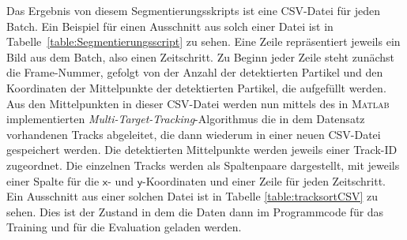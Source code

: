 Das Ergebnis von diesem Segmentierungsskripts ist eine CSV-Datei für jeden Batch.
Ein Beispiel für einen Ausschnitt aus solch einer Datei ist in Tabelle~\ref{table:Segmentierungsscript} zu sehen.
Eine Zeile repräsentiert jeweils ein Bild aus dem Batch, also einen Zeitschritt.
Zu Beginn jeder Zeile steht zunächst die Frame-Nummer, gefolgt von der Anzahl der detektierten Partikel
und den Koordinaten der Mittelpunkte der detektierten Partikel, die aufgefüllt werden.
Aus den Mittelpunkten in dieser CSV-Datei werden nun mittels des in \textsc{Matlab} implementierten \textit{Multi-Target-Tracking}-Algorithmus die in dem Datensatz vorhandenen Tracks abgeleitet,
die dann wiederum in einer neuen CSV-Datei gespeichert werden.
Die detektierten Mittelpunkte werden jeweils einer Track-ID zugeordnet.
Die einzelnen Tracks werden als Spaltenpaare dargestellt, mit jeweils einer Spalte für die \(\mathsf{x}\)- und \(\mathsf{y}\)-Koordinaten und einer Zeile für jeden Zeitschritt.
Ein Ausschnitt aus einer solchen Datei ist in Tabelle \ref{table:tracksortCSV} zu sehen.
Dies ist der Zustand in dem die Daten dann im Programmcode für das Training und für die Evaluation geladen werden. 

